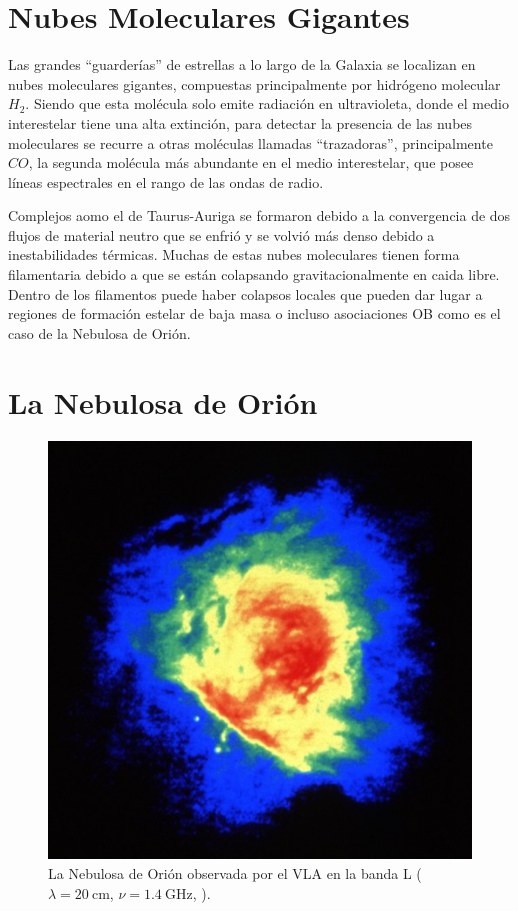 \section{Nubes Moleculares Gigantes}

Las grandes ``guarderías'' de estrellas a lo largo de la Galaxia se localizan en nubes moleculares gigantes, compuestas principalmente por hidrógeno molecular $H_2$.
Siendo que esta molécula solo emite radiación en ultravioleta, donde el medio interestelar tiene una alta extinción, para detectar la presencia de las nubes moleculares se recurre a otras moléculas llamadas ``trazadoras'', principalmente $CO$, la segunda molécula más abundante en el medio interestelar, que posee líneas espectrales en el rango de las ondas de radio.

Complejos aomo el de Taurus-Auriga se formaron debido a la convergencia de dos flujos de material neutro \citep{Ballesteros:1999} que se enfrió y se volvió más denso debido a inestabilidades térmicas. Muchas de estas nubes moleculares tienen forma filamentaria debido a que se están colapsando gravitacionalmente en caida libre. Dentro de los filamentos puede haber colapsos locales que pueden dar lugar a regiones de formación estelar de baja masa o incluso asociaciones OB como es el caso de la Nebulosa de Orión.

\section{La Nebulosa de Orión}

\begin{figure}
    \includegraphics[width=0.7\linewidth]{./Figures/OrionVR13A} 
  \caption{La Nebulosa de Orión observada por el VLA en la banda L ($\lambda = 20\mathrm{~cm}$, $\nu = 1.4\mathrm{~GHz}$, \citet{Yusef:1990}).}
\end{figure}

